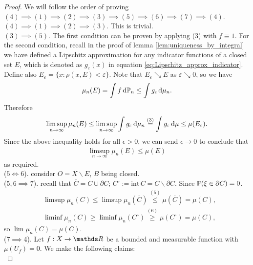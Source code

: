 \begin{proof} We will follow the order of proving $(4) \implies (1) \implies (2) \implies (3) \implies (5) \implies (6) \implies (7) \implies (4)$. \\

$(4) \implies (1) \implies (2) \implies (3)$. This is trivial.\\

$(3) \implies (5)$. The first condition can be proven by applying (3) with $f \equiv 1$. For the second condition, recall in the proof of lemma \ref{lem:uniqueness_by_integral} we have defined a Lipschitz approximation for any indicator functions of a closed set $E$, which is denoted as $g_\varepsilon(x)$ in equation \eqref{eq:Lipschitz_approx_indicator}. Define also $E_{\varepsilon} = \{ x : \rho(x,E) < \varepsilon\}$. Note that $E_\varepsilon \searrow E$ as $\varepsilon \searrow 0$, so we have
\begin{equation*}
    \mu_n(E) = \int f \, \mathrm{d} \mathbb{P}_n \le \int g_\epsilon \, \mathrm{d} \mu_n.
\end{equation*}
Therefore
\begin{align*}
    \limsup_{n \to \infty} \mu_n(E) \le \limsup_{n \to \infty} \int g_\varepsilon \, \mathrm{d} \mu_n \overset{(3)}{=} \int g_\varepsilon \, \mathrm{d} \mu \leq \mu(E_\varepsilon).
\end{align*}
Since the above inequality holds for all $\epsilon > 0$, we can send $\epsilon \to 0$ to conclude that
\begin{align*}
    \limsup_{n \to \infty} \mu_n(E) \le \mu(E)
\end{align*}
as required. \\

($5 \iff 6$). consider $O = X \backslash E$, $B$ being closed. \\

($5,6 \implies 7$). recall that $\overline{C} = C \cup \partial C$; $C^\circ := \text{int}\, C = C \backslash \partial C$. Since $\mathbb{P}(\xi \in \partial C) = 0$.
\begin{align*}
    &\limsup \mu_n(C) \le \limsup \mu_n (\overline{C}) \overset{(5)}{\le} \mu(\overline{C}) = \mu(C), \\
    &\liminf \mu_n(C) \ge \liminf \mu_n(C^\circ) \overset{(6)}{\ge} \mu(C^\circ) = \mu(C),
\end{align*}
so $\lim \mu_n(C) = \mu(C)$. \\

($7 \implies 4$). Let $f:X \to \R$ be a bounded and measurable function with $\mu(U_f) = 0$. We make the following claims:\\


\end{proof}

